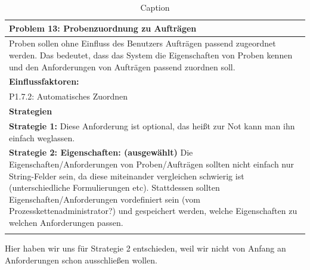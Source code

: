 \documentclass[enabledeprecatedfontcommands,fontsize=12pt,paper=a4,twoside]{scrartcl}
\begin{document}
\begin{table}[H]
    \centering
    \begin{tabular}{|p{15cm}|}
    \hline
          \textbf{Problem 13:} Probenzuordnung zu Aufträgen
          \\ \hline
          Proben sollen ohne Einfluss des Benutzers Aufträgen passend zugeordnet werden. Das bedeutet, dass das System die Eigenschaften von Proben kennen und den Anforderungen von Aufträgen passend zuordnen soll.
          \\ \hline
          \textbf{Einflussfaktoren: } \\
          P1.7.2: Automatisches Zuordnen \\
          \hline
          \textbf{Strategien} \\ \hline
          \textbf{Strategie 1:} Diese Anforderung ist optional, das heißt zur Not kann man ihn einfach weglassen. \\
	  \textbf{Strategie 2: Eigenschaften: (ausgewählt)} Die Eigenschaften/Anforderungen von Proben/Aufträgen sollten nicht einfach nur String-Felder sein, da diese miteinander vergleichen schwierig ist (unterschiedliche Formulierungen etc). Stattdessen sollten Eigenschaften/Anforderungen vordefiniert sein (vom Prozesskettenadministrator?) und gespeichert werden, welche Eigenschaften zu welchen Anforderungen passen. \\
          \\ \hline
    \end{tabular}
    \caption{Caption}
    \label{tab:my_label}
\end{table}
Hier haben wir uns für Strategie 2 entschieden, weil wir nicht von Anfang an Anforderungen schon ausschließen wollen. \\
\end{document}
